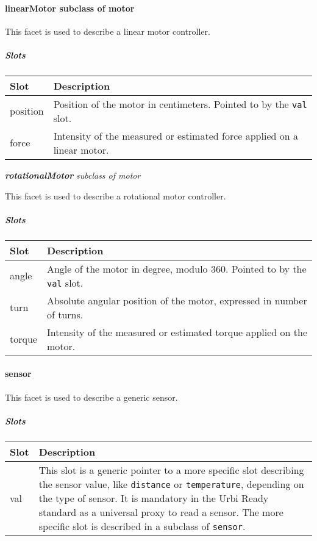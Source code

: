 \documentclass[a4paper]{article}
\begin{document}
\paragraph{ linearMotor  \textmd{subclass of motor}}

{\sffamily
This facet is used to describe a linear motor controller.}

\subparagraph{Slots}

\begin{flushleft}
\tablehead{}
\begin{supertabular}{|m{2.8669999cm}|m{12.422cm}|}
\hline
\sffamily\bfseries Slot &
\sffamily\bfseries Description\\\hline
position &
\sffamily Position of the motor in centimeters.
Pointed to by the \texttt{val} slot.\\\hline
force &
\sffamily Intensity of the measured or estimated
force applied on a linear motor.\\\hline
\end{supertabular}
\end{flushleft}
{
     \textsf{\textbf{\textit{rotationalMotor}}}
\textsf{\textit{subclass of motor}}}

{\sffamily
This facet is used to describe a rotational motor controller.}

\subparagraph{Slots}

\begin{flushleft}
\tablehead{}
\begin{supertabular}{|m{2.8669999cm}|m{12.422cm}|}
\hline
\sffamily\bfseries Slot &
\sffamily\bfseries Description\\\hline
angle &
\sffamily Angle of the motor in degree, modulo
360. Pointed to by the \texttt{val} slot.\\\hline
turn &
\sffamily Absolute angular position of the
motor, expressed in number of turns.\\\hline
torque &
\sffamily Intensity of the measured or estimated
torque applied on the motor.\\\hline
\end{supertabular}
\end{flushleft}
\paragraph{sensor}

{\sffamily
This facet is used to describe a generic sensor.}

\subparagraph{Slots}

\begin{flushleft}
\tablehead{}
\begin{supertabular}{|m{2.8669999cm}|m{12.422cm}|}
\hline
\sffamily\bfseries Slot &
\sffamily\bfseries Description\\\hline
val &
\sffamily This slot is a generic pointer to a
more specific slot describing the sensor value, like \texttt{distance}
or \texttt{temperature}, depending on the type of sensor. It is
mandatory in the Urbi Ready standard as a universal proxy to read a
sensor. The more specific slot is described in a subclass of
\texttt{sensor}.\\\hline
\end{supertabular}
\end{flushleft}
\end{document}
